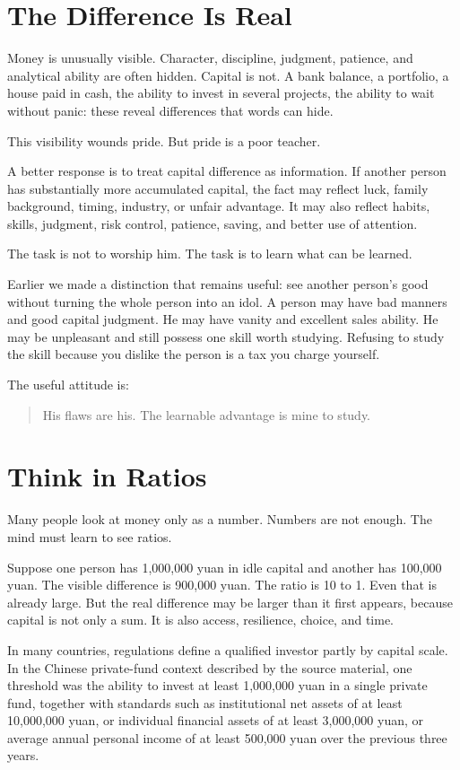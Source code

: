 \section*{The Difference Is Real}

Money is unusually visible. Character, discipline, judgment, patience, and analytical ability are often hidden. Capital is not. A bank balance, a portfolio, a house paid in cash, the ability to invest in several projects, the ability to wait without panic: these reveal differences that words can hide.

This visibility wounds pride. But pride is a poor teacher.

A better response is to treat capital difference as information. If another person has substantially more accumulated capital, the fact may reflect luck, family background, timing, industry, or unfair advantage. It may also reflect habits, skills, judgment, risk control, patience, saving, and better use of attention.

The task is not to worship him. The task is to learn what can be learned.

Earlier we made a distinction that remains useful: see another person's good without turning the whole person into an idol. A person may have bad manners and good capital judgment. He may have vanity and excellent sales ability. He may be unpleasant and still possess one skill worth studying. Refusing to study the skill because you dislike the person is a tax you charge yourself.

The useful attitude is:

\begin{quote}
His flaws are his. The learnable advantage is mine to study.
\end{quote}

\section*{Think in Ratios}

Many people look at money only as a number. Numbers are not enough. The mind must learn to see ratios.

Suppose one person has 1,000,000 yuan in idle capital and another has 100,000 yuan. The visible difference is 900,000 yuan. The ratio is 10 to 1. Even that is already large. But the real difference may be larger than it first appears, because capital is not only a sum. It is also access, resilience, choice, and time.

In many countries, regulations define a qualified investor partly by capital scale. In the Chinese private-fund context described by the source material, one threshold was the ability to invest at least 1,000,000 yuan in a single private fund, together with standards such as institutional net assets of at least 10,000,000 yuan, or individual financial assets of at least 3,000,000 yuan, or average annual personal income of at least 500,000 yuan over the previous three years.

